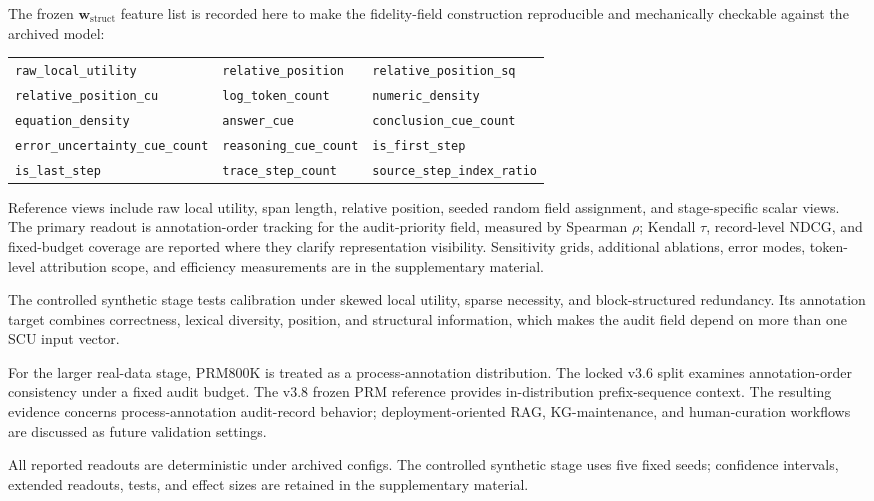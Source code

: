 \documentclass[a4paper,fleqn]{cas-sc}
\newcommand{\wstruct}{\ensuremath{\mathbf{w}_{\mathrm{struct}}}}
\begin{document}
The frozen \wstruct{} feature list is recorded here to make the fidelity-field construction reproducible and mechanically checkable against the archived model:
\begin{center}
\scriptsize
\begin{tabular}{lll}
\texttt{raw\_local\_utility} & \texttt{relative\_position} & \texttt{relative\_position\_sq} \\
\texttt{relative\_position\_cu} & \texttt{log\_token\_count} & \texttt{numeric\_density} \\
\texttt{equation\_density} & \texttt{answer\_cue} & \texttt{conclusion\_cue\_count} \\
\texttt{error\_uncertainty\_cue\_count} & \texttt{reasoning\_cue\_count} & \texttt{is\_first\_step} \\
\texttt{is\_last\_step} & \texttt{trace\_step\_count} & \texttt{source\_step\_index\_ratio}
\end{tabular}
\end{center}

Reference views include raw local utility, span length, relative position, seeded random field assignment, and stage-specific scalar views. The primary readout is annotation-order tracking for the audit-priority field, measured by Spearman $\rho$; Kendall $\tau$, record-level NDCG, and fixed-budget coverage are reported where they clarify representation visibility. Sensitivity grids, additional ablations, error modes, token-level attribution scope, and efficiency measurements are in the supplementary material.

The controlled synthetic stage tests calibration under skewed local utility, sparse necessity, and block-structured redundancy. Its annotation target combines correctness, lexical diversity, position, and structural information, which makes the audit field depend on more than one SCU input vector.

For the larger real-data stage, PRM800K is treated as a process-annotation distribution. The locked v3.6 split examines annotation-order consistency under a fixed audit budget. The v3.8 frozen PRM reference provides in-distribution prefix-sequence context. The resulting evidence concerns process-annotation audit-record behavior; deployment-oriented RAG, KG-maintenance, and human-curation workflows are discussed as future validation settings.

All reported readouts are deterministic under archived configs. The controlled synthetic stage uses five fixed seeds; confidence intervals, extended readouts, tests, and effect sizes are retained in the supplementary material.
\end{document}
